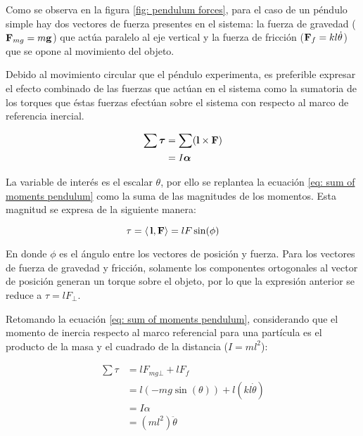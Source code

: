 Como se observa en la figura \ref{fig: pendulum forces}, 
para el caso de un péndulo simple 
hay dos vectores de fuerza presentes en el sistema:
la fuerza de gravedad ($\bold{F}_{mg} = m\bold{g}$) que actúa paralelo al eje vertical 
y la fuerza de fricción ($\bold{F}_f = kl\dot{\theta}$) que se opone al movimiento del objeto. 

Debido al movimiento circular que el péndulo experimenta,
es preferible expresar el efecto combinado
de las fuerzas que actúan en el sistema como
la sumatoria de los torques que éstas fuerzas
efectúan sobre el sistema con respecto al marco de
referencia inercial.

\begin{equation}
 \begin{split}
  \sum\boldsymbol{\tau} & = \sum (\bold{l} \times \bold{F})\\
  & = I \boldsymbol{\alpha}
 \end{split}
 \label{eq: sum of moments pendulum}
\end{equation}

La variable de interés es el escalar $\theta$, por ello
se replantea la ecuación \eqref{eq: sum of moments pendulum}
como la suma de las magnitudes de los momentos.
Esta magnitud se expresa de la siguiente manera:

\begin{equation}
 \tau =  \langle \, \bold{l} , \bold{F}\rangle=  l F \sin(\phi) \qquad 
\end{equation}

En donde $\phi$ es el ángulo entre los vectores de posición y fuerza. 
Para los vectores de fuerza de gravedad y fricción,
solamente los componentes ortogonales al vector de posición generan
un torque sobre el objeto, por lo que la expresión anterior se reduce a 
$\tau = l F_\bot$.

Retomando la ecuación \eqref{eq: sum of moments pendulum}, considerando 
que el momento de inercia respecto al marco referencial para una partícula es 
el producto de la masa y el cuadrado de la distancia ($ I = m l^2$):

\begin{equation}
\begin{split}
 \sum \tau &= l F_{mg\bot}  + l F_f\\
 & = l (-m g \sin(\theta))  + l (k l \dot{\theta})\\
 & = I \alpha \\
 & = (m l^2) \ddot{\theta}
 \end{split}
 \label{eq: sum of moments magnitude}
\end{equation}

